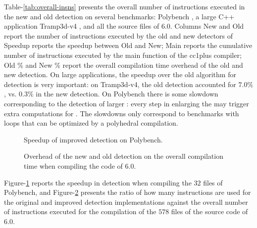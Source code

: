 \documentclass{sig-alternate}
\begin{document}
Table-\ref{tab:overall-insns} presents the overall number of instructions
executed in the new and old \SCoP{} detection on several benchmarks: Polybench
\cite{polybench}, a large C++ application Tramp3d-v4 \cite{richi}, and all the
source files of \GCC{} 6.0.  Columns New and Old report the number of instructions
executed by the old and new \SCoP{} detectors of \GCC{;} Speedup reports the speedup
between Old and New; Main reports the cumulative number of instructions executed
by the main function of the \GCC{} cc1plus compiler; Old \% and New \% report the
overall compilation time overhead of the old and new \SCoP{} detection.  On large
applications, the speedup over the old algorithm for \SCoP{} detection is very
important: on Tramp3d-v4, the old \SCoP{} detection accounted for $7.0\%$, vs.
$0.3\%$ in the new \SCoP{} detection.  On Polybench there is some slowdown
corresponding to the detection of larger : every step in enlarging the \SCoP{}
may trigger extra computations for .  The slowdowns only correspond to
benchmarks with loops that can be optimized by a polyhedral compilation.

\begin {figure}
  \begin{center}
    \resizebox{\linewidth}{!}{}
  \end{center}

  \vspace{-1em}

  \caption{Speedup of improved \SCoP{} detection on Polybench.}
  \label{fig:polybench-speedup}
\end {figure}

\begin {figure}
  \begin{center}
    \resizebox{\linewidth}{!}{}
  \end{center}

  \vspace{-1em}

  \caption{Overhead of the new and old \SCoP{} detection on the overall compilation
    time when compiling the code of \GCC{} 6.0.}
  \label{fig:gcc-speedup}
\end {figure}

Figure-\ref{fig:polybench-speedup} reports the speedup in \SCoP{} detection when
compiling the $32$ files of Polybench, and Figure-\ref{fig:gcc-speedup} presents
the ratio of how many instructions are used for the original and improved
\SCoP{} detection implementations against the overall number of instructions
executed for the compilation of the $578$ files of the source code of \GCC{}
6.0.
\end{document}
